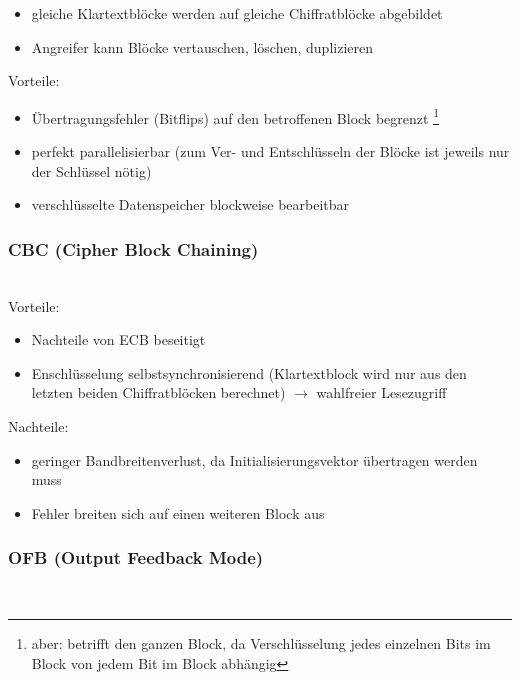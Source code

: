 \documentclass[a4paper,twoside,DIV15,BCOR12mm]{scrbook}
\begin{document}
\begin{itemize}
	\item gleiche Klartextblöcke werden auf gleiche Chiffratblöcke abgebildet
	\item Angreifer kann Blöcke vertauschen, löschen, duplizieren
\end{itemize}

Vorteile:

\begin{itemize}
	\item Übertragungsfehler (Bitflips) auf den betroffenen Block begrenzt \footnote{aber: betrifft den ganzen Block, da Verschlüsselung jedes einzelnen Bits im Block von jedem Bit im Block abhängig}
	\item perfekt parallelisierbar (zum Ver- und Entschlüsseln der Blöcke ist jeweils nur der Schlüssel nötig)
	\item verschlüsselte Datenspeicher blockweise bearbeitbar
\end{itemize}

\subsubsection{CBC (Cipher Block Chaining)}

\\

Vorteile:

\begin{itemize}
	\item Nachteile von ECB beseitigt
	\item Enschlüsselung selbstsynchronisierend (Klartextblock wird nur aus den letzten beiden Chiffratblöcken berechnet) $\rightarrow$ wahlfreier Lesezugriff
\end{itemize}

Nachteile:

\begin{itemize}
	\item geringer Bandbreitenverlust, da Initialisierungsvektor übertragen werden muss
	\item Fehler breiten sich auf einen weiteren Block aus
\end{itemize}

\subsubsection{OFB (Output Feedback Mode)}

\\
\end{document}
